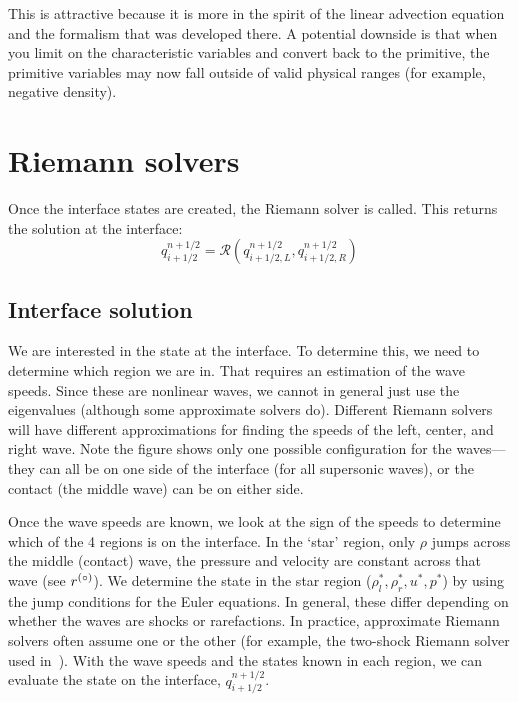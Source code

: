   This is attractive because it is more in the spirit of the linear
  advection equation and the formalism that was developed there.  A
  potential downside is that when you limit on the characteristic
  variables and convert back to the primitive, the primitive variables
  may now fall outside of valid physical ranges (for example, negative
  density).



\section{Riemann solvers}


Once the interface states are created, the Riemann solver is called.  This
returns the solution at the interface:
\begin{equation}
q_{i+1/2}^{n+1/2} = \mathcal{R}(q_{i+1/2,L}^{n+1/2}, q_{i+1/2,R}^{n+1/2})
\end{equation}

\subsection{Interface solution}

We are interested in the state at the interface.  To
determine this, we need to determine which region we are in.  That
requires an estimation of the wave speeds.  Since these are nonlinear
waves, we cannot in general just use the eigenvalues (although some
approximate solvers do).  Different Riemann solvers will have
different approximations for finding the speeds of the left, center,
and right wave.  Note the figure shows only one possible configuration
for the waves---they can all be on one side of the interface (for
all supersonic waves), or the contact (the middle wave) can be on either
side.

Once the wave speeds are known, we look at the sign of the speeds to
determine which of the 4 regions is on the interface.  In the `star'
region, only $\rho$ jumps across the middle (contact) wave, the
pressure and velocity are constant across that wave (see $r^{(\circ)}$).
We determine the state in the star region ($\rho_l^*, \rho_r^*, u^*,
p^*$) by using the jump conditions for the Euler equations.  In
general, these differ depending on whether the waves are shocks or
rarefactions.  In practice, approximate Riemann solvers often assume
one or the other (for example, the two-shock Riemann solver used
in~\cite{colellaglaz:1985}).  With the wave speeds and the states
known in each region, we can evaluate the state on the interface,
$q_{i+1/2}^{n+1/2}$.

